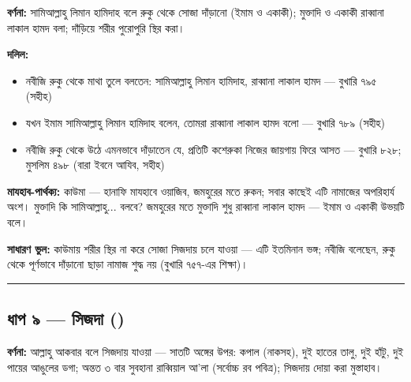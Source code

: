 \textbf{বর্ণনা:} সামিআল্লাহু লিমান হামিদাহ বলে রুকু থেকে সোজা দাঁড়ানো (ইমাম ও একাকী); মুক্তাদি ও একাকী রাব্বানা লাকাল হামদ বলা; দাঁড়িয়ে শরীর পুরোপুরি স্থির করা।

\textbf{দলিল:}
\begin{itemize}
\item {}নবীজি রুকু থেকে মাথা তুলে বলতেন: সামিআল্লাহু লিমান হামিদাহ, রাব্বানা লাকাল হামদ — বুখারি ৭৯৫ (সহীহ)
\item {}যখন ইমাম সামিআল্লাহু লিমান হামিদাহ বলেন, তোমরা রাব্বানা লাকাল হামদ বলো — বুখারি ৭৮৯ (সহীহ)
\item {}নবীজি রুকু থেকে উঠে এমনভাবে দাঁড়াতেন যে, প্রতিটি কশেরুকা নিজের জায়গায় ফিরে আসত — বুখারি ৮২৮; মুসলিম ৪৯৮ (বারা ইবনে আযিব, সহীহ)
\end{itemize}
\textbf{মাযহাব-পার্থক্য:} কাউমা — হানাফি মাযহাবে ওয়াজিব, জমহুরের মতে রুকন; সবার কাছেই এটি নামাজের অপরিহার্য অংশ। মুক্তাদি কি সামিআল্লাহু... বলবে? জমহুরের মতে মুক্তাদি শুধু রাব্বানা লাকাল হামদ — ইমাম ও একাকী উভয়টি বলে।

\textbf{সাধারণ ভুল:} কাউমায় শরীর স্থির না করে সোজা সিজদায় চলে যাওয়া — এটি ইতমিনান ভঙ্গ; নবীজি বলেছেন, রুকু থেকে পূর্ণভাবে দাঁড়ানো ছাড়া নামাজ শুদ্ধ নয় (বুখারি ৭৫৭-এর শিক্ষা)।

\medskip\hrule\medskip

\subsection*{ধাপ ৯ — সিজদা ()}

\textbf{বর্ণনা:} আল্লাহু আকবার বলে সিজদায় যাওয়া — সাতটি অঙ্গের উপর: কপাল (নাকসহ), দুই হাতের তালু, দুই হাঁটু, দুই পায়ের আঙুলের ডগা; অন্তত ৩ বার সুবহানা রাব্বিয়াল আ'লা (সর্বোচ্চ রব পবিত্র); সিজদায় দোয়া করা মুস্তাহাব।

